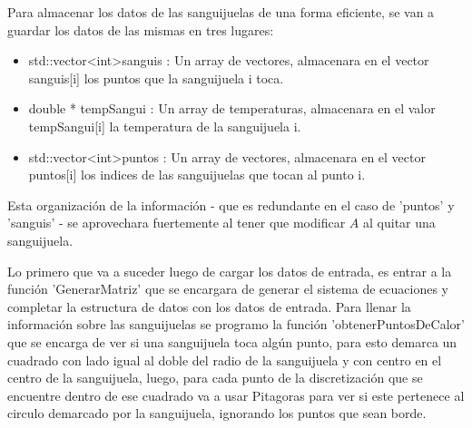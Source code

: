 \documentclass[a4paper]{article}
\begin{document}
Para almacenar los datos de las sanguijuelas de una forma eficiente, se van a guardar los datos de las mismas en tres lugares:
\begin{itemize}
 \item std::vector\textless int\textgreater *sanguis : Un array de vectores, almacenara en el vector sanguis[i] los puntos que la sanguijuela i toca. 
 \item double * tempSangui : Un array de temperaturas, almacenara en el valor tempSangui[i] la temperatura de la sanguijuela i.
 \item std::vector\textless int\textgreater *puntos : Un array de vectores, almacenara en el vector puntos[i] los indices de las sanguijuelas que tocan al punto i.
\end{itemize}
Esta organización de la información - que es redundante en el caso de 'puntos' y 'sanguis' - se aprovechara fuertemente al tener que modificar $A$ al quitar una sanguijuela.\par
\smallskip
Lo primero que va a suceder luego de cargar los datos de entrada, es entrar a la función 'GenerarMatriz' que se encargara de generar el sistema de ecuaciones y completar la estructura de datos con los datos de entrada. Para llenar la información sobre las sanguijuelas se programo la función 'obtenerPuntosDeCalor' que se encarga de ver si una sanguijuela toca algún punto, para esto demarca un cuadrado con lado igual al doble del radio de la sanguijuela y con centro en el centro de la sanguijuela, luego, para cada punto de la discretización que se encuentre dentro de ese cuadrado va a usar Pitagoras para ver si este pertenece al circulo demarcado por la sanguijuela, ignorando los puntos que sean borde.
\end{document}
